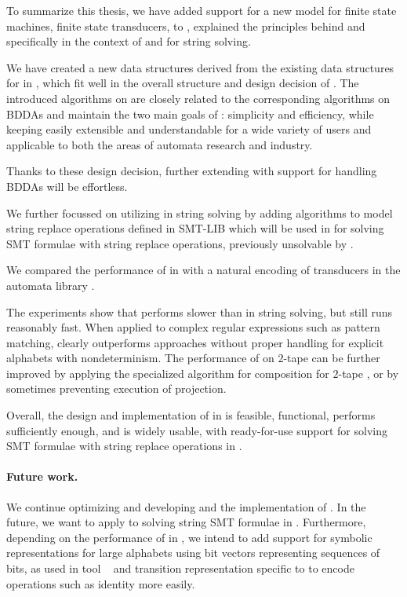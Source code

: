 To summarize this thesis, we have added support for a new model for finite state machines, finite state transducers, to \mata, explained the principles behind \nfts and specifically \nfts in the context of \mata and \noodler for string solving.

We have created a new data structures derived from the existing data structures for \nfas in \mata, which fit well in the overall structure and design decision of \mata.
The introduced algorithms on \nfts are closely related to the corresponding algorithms on BDDAs and maintain the two main goals of \mata: simplicity and efficiency, while keeping \mata easily extensible and understandable for a wide variety of users and applicable to both the areas of automata research and industry.

Thanks to these design decision, further extending \mata with support for handling BDDAs will be effortless.

We further focussed on utilizing \nfts in string solving by adding algorithms to model string replace operations defined in SMT-LIB which will be used in \noodler for solving SMT formulae with string replace operations, previously unsolvable by \noodler.

We compared the performance of \nfts in \mata with a natural encoding of transducers in the automata library \mona.

The experiments show that \mata performs slower than \mona in string solving, but still runs reasonably fast.
When applied to complex regular expressions such as pattern matching, \mata clearly outperforms approaches without proper handling for explicit alphabets with nondeterminism.
The performance of \mata on $2$-tape \nfts can be further improved by applying the specialized algorithm for composition for $2$-tape \nfts, or by sometimes preventing execution of projection.

Overall, the design and implementation of \nfts in \mata is feasible, functional, performs sufficiently enough, and is widely usable, with ready-for-use support for solving SMT formulae with string replace operations in \noodler.

\paragraph{Future work.}
We continue optimizing and developing \mata and the implementation of \nfts.
In the future, we want to apply \nfts to solving string SMT formulae in \noodler.
Furthermore, depending on the performance of \nfts in \noodler, we intend to add support for symbolic representations for large alphabets using bit vectors representing sequences of bits, as used in tool \lash~\cite{lash} and transition representation specific to \nfts to encode \nft operations such as identity more easily.

